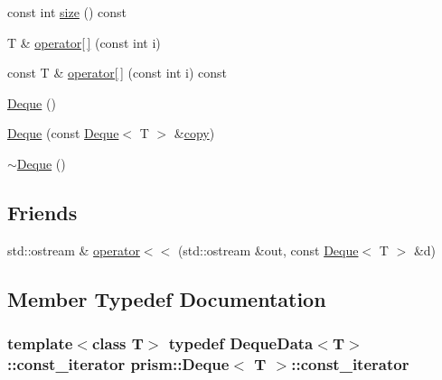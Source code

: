 \begin{DoxyCompactItemize}
const int \hyperlink{classprism_1_1_deque_a38e141650506c5b320093c5bd5486a8c}{size} () const 
\item 
T \& \hyperlink{classprism_1_1_deque_a6d8b73a55b14e25fcf2dbf1d44e4df4c}{operator\mbox{[}$\,$\mbox{]}} (const int i)
\item 
const T \& \hyperlink{classprism_1_1_deque_a1dbcf60871380a1dba7c8093601c7e48}{operator\mbox{[}$\,$\mbox{]}} (const int i) const 
\item 
\hyperlink{classprism_1_1_deque_ae8fcffd4a0cf7dba0e33a6983641efc2}{Deque} ()
\item 
\hyperlink{classprism_1_1_deque_abaa7ff51e27ef7acb0ca1afe523e7976}{Deque} (const \hyperlink{classprism_1_1_deque}{Deque}$<$ T $>$ \&\hyperlink{namespaceprism_ae776f4cd825f79e7af1cf6ee1d90a209}{copy})
\item 
\hyperlink{classprism_1_1_deque_a2a06b6247712d843c6f23df8ba807ca7}{$\sim$\+Deque} ()
\end{DoxyCompactItemize}
\subsection*{Friends}
\begin{DoxyCompactItemize}
\item 
std\+::ostream \& \hyperlink{classprism_1_1_deque_ad61d2d7b39e3a685744108225e82f123}{operator$<$$<$} (std\+::ostream \&out, const \hyperlink{classprism_1_1_deque}{Deque}$<$ T $>$ \&d)
\end{DoxyCompactItemize}


\subsection{Member Typedef Documentation}
\subsubsection[{\texorpdfstring{const\+\_\+iterator}{const_iterator}}]{\setlength{\rightskip}{0pt plus 5cm}template$<$class T$>$ typedef Deque\+Data$<$T$>$\+::{\bf const\+\_\+iterator} {\bf prism\+::\+Deque}$<$ T $>$\+::{\bf const\+\_\+iterator}}\hypertarget{classprism_1_1_deque_afc2f71fd5b01e963e093f64cc4da94ec}{}\label{classprism_1_1_deque_afc2f71fd5b01e963e093f64cc4da94ec}

